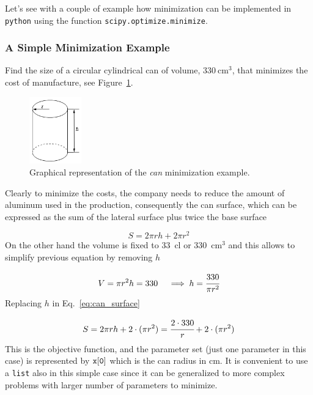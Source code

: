 Let's see with a couple of example how minimization can be implemented in \texttt{python} using the function \texttt{scipy.optimize.minimize}.

\subsubsection{A Simple Minimization Example}
\label{example}

Find the size of a circular cylindrical can of volume, \(330~\mathrm{cm}^3\), that minimizes the cost of manufacture, see Figure~\ref{fig:cylinder}.

\begin{figure}[h]
\centering
\includegraphics[width=0.2\textwidth]{figures/cylinder.png}
\caption{Graphical representation of the \emph{can} minimization example.}
\label{fig:cylinder}
\end{figure}

Clearly to minimize the costs, the company needs to reduce the amount of aluminum used in the production, consequently the can surface, which can be expressed as the sum of the lateral surface plus twice the base surface

\begin{equation*} 
S = 2\pi rh + 2\pi r^2 
\label{eq:can_surface}
\end{equation*}
On the other hand the volume is fixed to 33~cl or 330~\(\mathrm{cm}^3\) and this allows to simplify previous
equation by removing \(h\)

\begin{equation*} 
V = \pi r^2 h = 330\quad\implies h = \cfrac{330}{\pi r^2}
\end{equation*}
Replacing $h$ in Eq.~\ref{eq:can_surface} 

\begin{equation}
S = 2\pi rh + 2\cdot(\pi r^2) = \cfrac{2\cdot 330}{r} + 2\cdot(\pi r^2)
\end{equation}
This is the objective function, and the parameter set (just one parameter in this case) is represented by \(\tt{x[0]}\) which is the can radius in cm. It is convenient to use a \texttt{list} also in this simple case since it can be generalized to more complex problems with larger number of parameters to minimize. 

